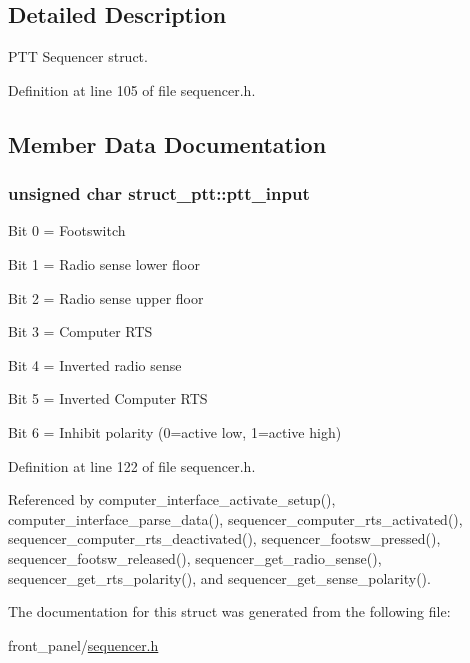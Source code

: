\subsection{Detailed Description}
PTT Sequencer struct. 

Definition at line 105 of file sequencer.h.

\subsection{Member Data Documentation}
\hypertarget{structstruct__ptt_43c60729257a2cb42fc44af21e394224}{
\subsubsection[{ptt\_\-input}]{\setlength{\rightskip}{0pt plus 5cm}unsigned char {\bf struct\_\-ptt::ptt\_\-input}}}
\label{structstruct__ptt_43c60729257a2cb42fc44af21e394224}


Bit 0 = Footswitch \par
 Bit 1 = Radio sense lower floor \par
 Bit 2 = Radio sense upper floor \par
 Bit 3 = Computer RTS \par
 Bit 4 = Inverted radio sense \par
 Bit 5 = Inverted Computer RTS \par
 Bit 6 = Inhibit polarity (0=active low, 1=active high) \par
 

Definition at line 122 of file sequencer.h.

Referenced by computer\_\-interface\_\-activate\_\-setup(), computer\_\-interface\_\-parse\_\-data(), sequencer\_\-computer\_\-rts\_\-activated(), sequencer\_\-computer\_\-rts\_\-deactivated(), sequencer\_\-footsw\_\-pressed(), sequencer\_\-footsw\_\-released(), sequencer\_\-get\_\-radio\_\-sense(), sequencer\_\-get\_\-rts\_\-polarity(), and sequencer\_\-get\_\-sense\_\-polarity().

The documentation for this struct was generated from the following file:\begin{CompactItemize}
\item 
front\_\-panel/\hyperlink{sequencer_8h}{sequencer.h}\end{CompactItemize}
